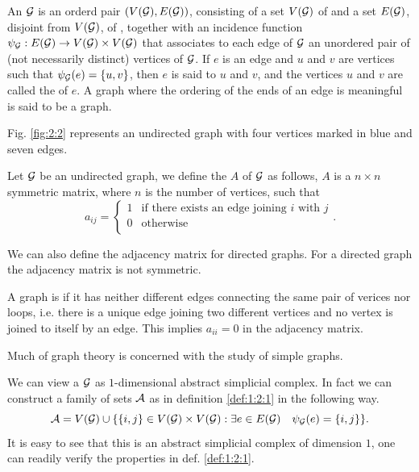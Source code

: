 \documentclass[../2.tex]{subfiles}
\begin{document}
    \begin{defn}
        An  $\mathcal{G}$ is an orderd pair $(V(\mathcal{G}),E(\mathcal{G}))$, consisting of a set $V(\mathcal{G})$ of 
        and a set $E(\mathcal{G})$, disjoint from $V(\mathcal{G})$, of , together with an incidence function
        $\psi_{\mathcal{G}}:E(\mathcal{G}) \to V(\mathcal{G}) \times V(\mathcal{G})$ that associates to each edge of $\mathcal{G}$ an unordered pair of (not necessarily
        distinct) vertices of $\mathcal{G}$. If $e$ is an edge and $u$ and $v$ are vertices such that $\psi_{\mathcal{G}}(e) =
        \{u, v\}$, then $e$ is said to  $u$ and $v$, and the vertices $u$ and $v$ are called the 
        of $e$. A graph where the ordering of the ends of an edge is meaningful is said to be a  graph.
    \end{defn}

    Fig. \ref{fig:2:2} represents an undirected graph with four vertices marked in blue and seven edges.

    \begin{defn}
        Let $\mathcal{G}$ be an undirected graph, we define the  $A$ of $\mathcal{G}$ as follows,
        $A$ is a $n \times n$ symmetric matrix, where $n$ is the number of vertices, such that
        \[a_{ij} = 
        \begin{cases}
            1 & \text{if there exists an edge joining $i$ with $j$} \\
            0 & \text{otherwise} \\
        \end{cases}. \]        
    \end{defn}

    \begin{rem}
        We can also define the adjacency matrix for directed graphs.
        For a directed graph the adjacency matrix is not symmetric.
    \end{rem}

    \begin{defn}
        A graph is  if it has neither different edges connecting the same pair of verices nor loops, i.e. there is a unique edge joining two different vertices
        and no vertex is joined to itself by an edge. This implies $a_{ii} = 0$ in the adjacency matrix.
    \end{defn}
    
    Much of graph theory is concerned with the study of simple graphs.

    \begin{obs}
        We can view a  $\mathcal{G}$ as $1$-dimensional abstract simplicial complex.
        In fact we can construct a family of sets $\mathcal{A}$ as in definition \ref{def:1:2:1} in the following way.
        \[ \mathcal{A} = V(\mathcal{G}) \cup \{ \{i,j\} \in V(\mathcal{G}) \times V(\mathcal{G}) : \exists e \in E(\mathcal{G}) \quad \psi_{\mathcal{G}}(e)=\{i,j\}\}. \]
        It is easy to see that this is an abstract simplicial complex of dimension $1$, one can readily verify the properties in def. \ref{def:1:2:1}.
    \end{obs}
\end{document}
